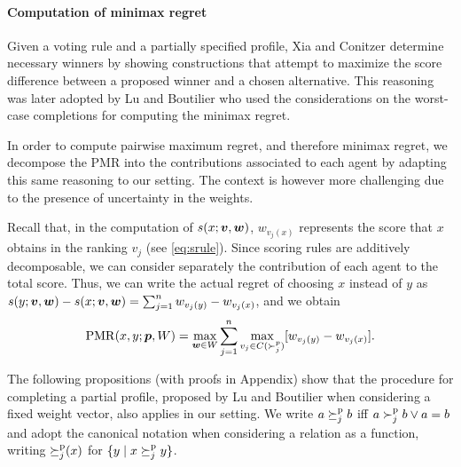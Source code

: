 \documentclass[runningheads]{llncs}
\begin{document}

\paragraph{Computation of minimax regret}
Given a voting rule and a partially specified profile, Xia and Conitzer \cite{Xia2008} determine necessary winners by showing constructions that attempt to maximize the score difference between a proposed winner and a chosen alternative. This reasoning was later adopted by Lu and Boutilier \cite{Lu2011} who used the considerations on the worst-case completions for computing the minimax regret. 

In order to compute pairwise maximum regret, and therefore minimax regret, we decompose the PMR into the contributions associated to each agent by adapting this same reasoning to our setting. The context is however more challenging due to the presence of uncertainty in the weights.

Recall that, in the computation of $s(x; \bm{v}, \bm{w})$, $w_{v_j(x)}$ represents the score that $x$ obtains in the ranking $v_j$ (see \cref{eq:srule}).
Since scoring rules are additively decomposable, we can consider separately the contribution of each agent to the total score. Thus, we can write the actual regret of choosing $x$ instead of $y$ as $s(y; \bm{v},\bm{w}) - s(x; \bm{v}, \bm{w}) = \sum_{j=1}^n w_{v_j(y)} - w_{v_j(x)}$, and we obtain \[\operatorname{PMR}(x,y; {\bm{p}}, W) =  \max_{\bm{w} \in W} \sum_{j=1}^{n} \max_{v_j \in C(\succ_j^p)} [w_{v_j(y)} - w_{v_j(x)}].\]

The following propositions (with proofs in Appendix) show that the procedure for completing a partial profile,  proposed by Lu and Boutilier \cite{Lu2011} when considering a fixed weight vector, also applies in our setting. We write $a \succeq^\text{p}_j b$ iff $a \succ^\text{p}_j b \lor a = b$ and adopt the canonical notation when considering a relation as a function, writing ${\succeq^\text{p}_j}(x)$ for $\set{y \suchthat x \pprefeq_j y}$.
\end{document}
